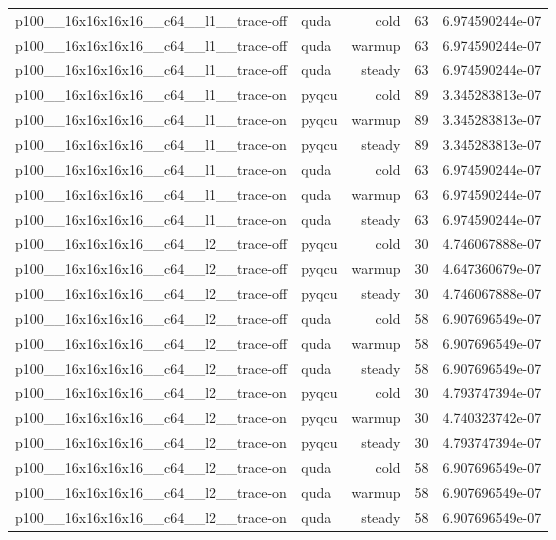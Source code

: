 \begin{table}[htbp]
\begin{tabular}{@{}llrrr@{}}
p100\_\_16x16x16x16\_\_c64\_\_l1\_\_trace-off & quda & cold & 63 & 6.974590244e-07 \\
p100\_\_16x16x16x16\_\_c64\_\_l1\_\_trace-off & quda & warmup & 63 & 6.974590244e-07 \\
p100\_\_16x16x16x16\_\_c64\_\_l1\_\_trace-off & quda & steady & 63 & 6.974590244e-07 \\
p100\_\_16x16x16x16\_\_c64\_\_l1\_\_trace-on & pyqcu & cold & 89 & 3.345283813e-07 \\
p100\_\_16x16x16x16\_\_c64\_\_l1\_\_trace-on & pyqcu & warmup & 89 & 3.345283813e-07 \\
p100\_\_16x16x16x16\_\_c64\_\_l1\_\_trace-on & pyqcu & steady & 89 & 3.345283813e-07 \\
p100\_\_16x16x16x16\_\_c64\_\_l1\_\_trace-on & quda & cold & 63 & 6.974590244e-07 \\
p100\_\_16x16x16x16\_\_c64\_\_l1\_\_trace-on & quda & warmup & 63 & 6.974590244e-07 \\
p100\_\_16x16x16x16\_\_c64\_\_l1\_\_trace-on & quda & steady & 63 & 6.974590244e-07 \\
p100\_\_16x16x16x16\_\_c64\_\_l2\_\_trace-off & pyqcu & cold & 30 & 4.746067888e-07 \\
p100\_\_16x16x16x16\_\_c64\_\_l2\_\_trace-off & pyqcu & warmup & 30 & 4.647360679e-07 \\
p100\_\_16x16x16x16\_\_c64\_\_l2\_\_trace-off & pyqcu & steady & 30 & 4.746067888e-07 \\
p100\_\_16x16x16x16\_\_c64\_\_l2\_\_trace-off & quda & cold & 58 & 6.907696549e-07 \\
p100\_\_16x16x16x16\_\_c64\_\_l2\_\_trace-off & quda & warmup & 58 & 6.907696549e-07 \\
p100\_\_16x16x16x16\_\_c64\_\_l2\_\_trace-off & quda & steady & 58 & 6.907696549e-07 \\
p100\_\_16x16x16x16\_\_c64\_\_l2\_\_trace-on & pyqcu & cold & 30 & 4.793747394e-07 \\
p100\_\_16x16x16x16\_\_c64\_\_l2\_\_trace-on & pyqcu & warmup & 30 & 4.740323742e-07 \\
p100\_\_16x16x16x16\_\_c64\_\_l2\_\_trace-on & pyqcu & steady & 30 & 4.793747394e-07 \\
p100\_\_16x16x16x16\_\_c64\_\_l2\_\_trace-on & quda & cold & 58 & 6.907696549e-07 \\
p100\_\_16x16x16x16\_\_c64\_\_l2\_\_trace-on & quda & warmup & 58 & 6.907696549e-07 \\
p100\_\_16x16x16x16\_\_c64\_\_l2\_\_trace-on & quda & steady & 58 & 6.907696549e-07 \\

\end{tabular}
\end{table}
